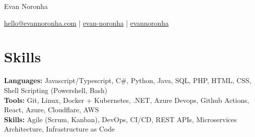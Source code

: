 \documentclass[11pt]{article}       %
\begin{document}
\centerline{\Huge Evan Noronha}

\vspace{5pt}

\centerline {\href{mailto:hello@evannoronha.com}{\faEnvelope \space hello@evannoronha.com} | \href{https://www.linkedin.com/in/evan-noronha/}{\faLinkedin \space evan-noronha} | \href{https://github.com/evannoronha}{\faGithub \space evannoronha}}

\vspace{-10pt}

\section*{Skills}
\textbf{Languages:} Javascript/Typescript, C\#, Python, Java, SQL, PHP, HTML, CSS, Shell Scripting (Powershell, Bash)\\
\textbf{Tools:} Git, Linux, Docker + Kubernetes, .NET, Azure Devops, Github Actions, React, Azure, Cloudflare, AWS \\
\textbf{Skills:} Agile (Scrum, Kanban), DevOps, CI/CD, REST APIs, Microservices Architecture, Infrastructure as Code \\

\vspace{-6.5pt}

\end{document}
